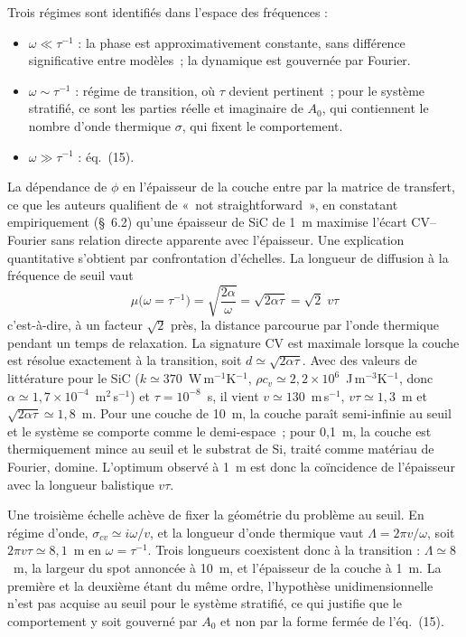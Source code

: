 \documentclass[11pt,a4paper]{article}
\begin{document}
Trois régimes sont identifiés dans l'espace des fréquences :

\begin{itemize}[leftmargin=1.2em,itemsep=2pt,topsep=2pt]
\item $\omega \ll \tau^{-1}$ : la phase est approximativement constante, sans différence
      significative entre modèles~; la dynamique est gouvernée par Fourier.
\item $\omega \sim \tau^{-1}$ : régime de transition, où $\tau$ devient pertinent~; pour le
      système stratifié, ce sont les parties réelle et imaginaire de $A_0$, qui contiennent le
      nombre d'onde thermique $\sigma$, qui fixent le comportement.
\item $\omega \gg \tau^{-1}$ : éq.~(15).
\end{itemize}

La dépendance de $\phi$ en l'épaisseur de la couche entre par la matrice de transfert, ce que
les auteurs qualifient de «~not straightforward~», en constatant empiriquement (§~6.2) qu'une
épaisseur de SiC de 1~\textmu m maximise l'écart CV--Fourier sans relation directe apparente
avec l'épaisseur. Une explication quantitative s'obtient par confrontation d'échelles. La
longueur de diffusion à la fréquence de seuil vaut
\[
\mu\big(\omega = \tau^{-1}\big) = \sqrt{\frac{2\alpha}{\omega}} = \sqrt{2\alpha\tau}
= \sqrt{2}\;v\tau
\]
c'est-à-dire, à un facteur $\sqrt 2$ près, la distance parcourue par l'onde thermique pendant un
temps de relaxation. La signature CV est maximale lorsque la couche est résolue exactement à la
transition, soit $d \simeq \sqrt{2\alpha\tau}$. Avec des valeurs de littérature pour le SiC
($k \simeq 370$~W\,m$^{-1}$K$^{-1}$, $\rho c_v \simeq 2{,}2\times10^6$~J\,m$^{-3}$K$^{-1}$, donc
$\alpha \simeq 1{,}7\times10^{-4}$~m$^2$\,s$^{-1}$) et $\tau = 10^{-8}$~s, il vient
$v \simeq 130$~m\,s$^{-1}$, $v\tau \simeq 1{,}3$~\textmu m et
$\sqrt{2\alpha\tau} \simeq 1{,}8$~\textmu m. Pour une couche de 10~\textmu m, la couche paraît
semi-infinie au seuil et le système se comporte comme le demi-espace~; pour 0,1~\textmu m, la
couche est thermiquement mince au seuil et le substrat de Si, traité comme matériau de Fourier,
domine. L'optimum observé à 1~\textmu m est donc la coïncidence de l'épaisseur avec la longueur
balistique $v\tau$.

Une troisième échelle achève de fixer la géométrie du problème au seuil. En régime d'onde,
$\sigma_{cv} \simeq i\omega/v$, et la longueur d'onde thermique vaut $\Lambda = 2\pi v/\omega$,
soit $2\pi v\tau \simeq 8{,}1$~\textmu m en $\omega = \tau^{-1}$. Trois longueurs coexistent
donc à la transition : $\Lambda \simeq 8$~\textmu m, la largeur du spot annoncée à
10~\textmu m, et l'épaisseur de la couche à 1~\textmu m. La première et la deuxième étant du
même ordre, l'hypothèse unidimensionnelle n'est pas acquise au seuil pour le système stratifié,
ce qui justifie que le comportement y soit gouverné par $A_0$ et non par la forme fermée de
l'éq.~(15).
\end{document}
